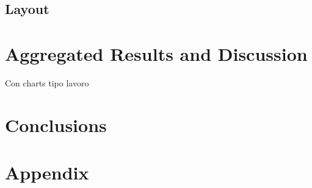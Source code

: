\documentclass[a4paper,12pt]{report}
\begin{document}
	\section{Layout}


	\chapter{Aggregated Results and Discussion}
	\label{ch: Aggregated Results and Discussion}
Con charts tipo lavoro


	\chapter{Conclusions}
	\label{ch:Conclusions}


	\appendix
	\chapter{Appendix}
\end{document}

